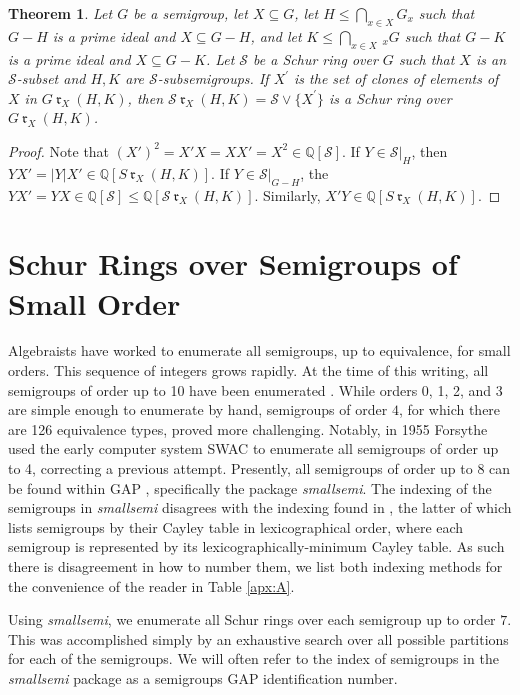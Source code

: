 \documentclass{article}
\theoremstyle{plain}
\newtheorem{Thm}{Theorem}[section]
\theoremstyle{definition}
\renewcommand{\S}{\mathcal{S}}
\newcommand{\Q}{\mathbb{Q}}
\newcommand{\QS}{\Q[\S]}
\renewcommand{\r}[1]{\ \mathfrak{r}_{#1}\ }
\begin{document}
\begin{Thm}\label{thm:rosterrings}
Let $G$ be a semigroup, let $X\subseteq G$, let $H\le \bigcap_{x\in X} G_x$ such that $G-H$ is a prime ideal and $X\subseteq G-H$, and let $K\le \bigcap_{x\in X}\, _xG$ such that $G-K$ is a prime ideal  and $X\subseteq G-K$. Let $\S$ be a Schur ring over $G$ such that $X$ is an $\S$-subset and $H,K$ are $\S$-subsemigroups. If $X^\prime$ is the set of clones of elements of $X$ in $G\r X (H,K)$, then $\S \r X (H,K) =\S\vee \{X^\prime\}$ is a Schur ring over $G\r X (H,K)$.
\end{Thm}
\begin{proof}
Note that $\left(X'\right)^2 = X'X = XX' = X^2 \in \QS$. If $Y\in \S|_H$, then $YX' = |Y|X'\in\Q[S\r X(H,K)]$. If $Y\in \S|_{G-H}$, the $YX'=YX\in \QS \le \Q[\S \r X (H,K)]$. Similarly, $X'Y \in \Q[S\r X(H,K)]$.
\end{proof}

\section{Schur Rings over Semigroups of Small Order}\label{gap}
Algebraists have worked to enumerate all semigroups, up to equivalence, for small orders. This sequence of integers grows rapidly. At the time of this writing, all semigroups of order up to 10 have been enumerated \cite[A001423]{semicount}. While orders 0, 1, 2, and 3 are simple enough to enumerate by hand, semigroups of order $4$, for which there are 126 equivalence types, proved more challenging. Notably, in 1955 Forsythe \cite{Forsythe} used the early computer system SWAC to enumerate all semigroups of order up to 4, correcting a previous attempt. Presently, all semigroups of order up to 8 can be found within GAP \cite{GAP}, specifically the package \emph{smallsemi}. The indexing of the semigroups in \emph{smallsemi} disagrees with the indexing found in \cite{Forsythe}, the latter of which lists semigroups by their Cayley table in lexicographical order, where each semigroup is represented by its lexicographically-minimum Cayley table. As such there is disagreement in how to number them, we list both indexing methods for the convenience of the reader in Table \ref{apx:A}. 

Using \emph{smallsemi}, we enumerate all Schur rings over each semigroup up to order $7$. This was accomplished simply by an exhaustive search over all possible partitions for each of the semigroups. We will often refer to the index of semigroups in the \emph{smallsemi} package as a semigroups GAP identification number.
\end{document}
